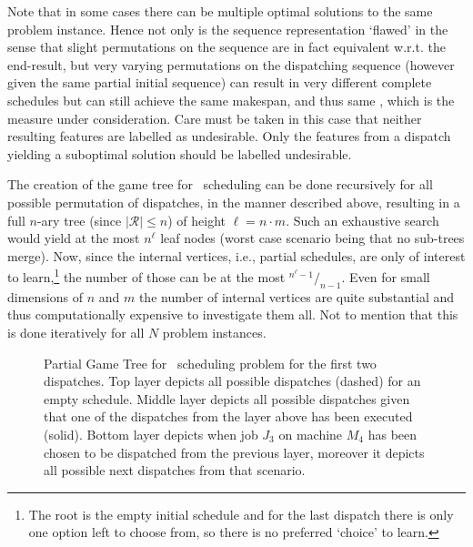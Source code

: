Note that in some cases there can be multiple optimal solutions to the same problem instance. Hence not only is the sequence representation `flawed' in the sense that slight permutations on the sequence are in fact equivalent w.r.t. the end-result, but very varying permutations on the dispatching sequence (however given the same partial initial sequence) can result in very different complete schedules but can still achieve the same makespan, and thus same \fullnamerho, which is the measure under consideration. Care must be taken in this case that neither resulting features are labelled as undesirable. Only the features from a dispatch yielding a suboptimal solution should be labelled undesirable. 

The creation of the game tree for \jsp\ scheduling can be done recursively for all possible permutation of dispatches, in the manner described above, resulting in a full \mbox{$n$-ary} tree (since $|\mathcal{R}|\leq n$) of height $\ell=n\cdot m$. Such an exhaustive search would yield at the most $n^{\ell}$ leaf nodes (worst case scenario being that no sub-trees merge). Now, since the internal vertices, i.e., partial schedules, are only of interest to learn,\footnote{The root is the empty initial schedule and for the last dispatch there is only one option left to choose from, so there is no preferred `choice' to learn.} the number of those can be at the most \mbox{${}^{n^{\ell}-1}/_{n-1}$}.
Even for small dimensions of $n$ and $m$ the number of internal vertices are quite substantial and thus computationally expensive to investigate them all. Not to mention that this is done iteratively for all $N$ problem instances.

\begin{figure}
\caption[Partial Game Tree for \JSP]{Partial Game Tree for \jsp\ scheduling problem for the first two dispatches. 
Top layer depicts all possible dispatches (dashed) for an empty schedule. 
Middle layer depicts all possible dispatches given that one of the dispatches from the layer above has been executed (solid). 
Bottom layer depicts when job $J_3$ on machine $M_4$ has been chosen to be dispatched from the previous layer, moreover it depicts all possible next dispatches from that scenario.}
\label{fig:jssp:gametree}
\end{figure}

